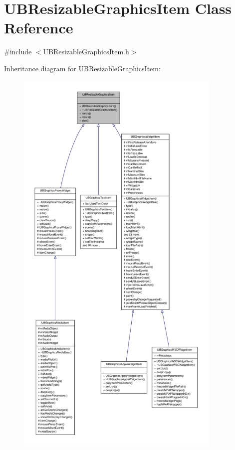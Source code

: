 \hypertarget{class_u_b_resizable_graphics_item}{\section{U\-B\-Resizable\-Graphics\-Item Class Reference}
\label{d7/dad/class_u_b_resizable_graphics_item}
}


{\ttfamily \#include $<$U\-B\-Resizable\-Graphics\-Item.\-h$>$}



Inheritance diagram for U\-B\-Resizable\-Graphics\-Item\-:
\nopagebreak
\begin{figure}[H]
\begin{center}
\leavevmode
\includegraphics[height=550pt]{d3/d7d/class_u_b_resizable_graphics_item__inherit__graph}
\end{center}
\end{figure}


